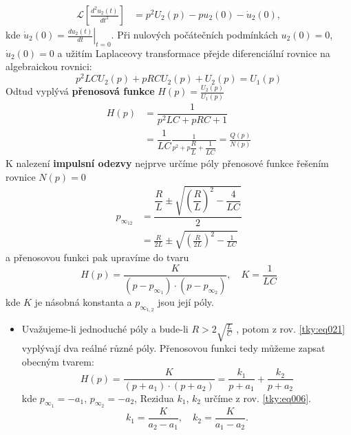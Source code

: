 \begin{mdframed}[style=mdexam]
\begin{example}
\begin{align*}
      \mathcal{L}\left[\frac{d^2u_2(t)}{dt^2}\right] &= p^2U_2(p)-pu_2(0)-\dot{u}_2(0),
    \end{align*}
    kde \(\dot{u}_2(0)=\left.\frac{du_2(t)}{dt}\right\rvert_{t=0}\). Při nulových počátečních
    podmínkách \(u_2(0) = 0\), \(\dot{u}_2(0) = 0\) a užitím Laplaceovy transformace přejde
    diferenciální rovnice na algebraickou rovnici:
    \begin{equation*}
      p^2LCU_2(p)+pRCU_2(p)+U_2(p)=U_1(p)
    \end{equation*}
    Odtud vyplývá \textbf{přenosová funkce} $H(p)=\frac{U_2(p)}{U_1(p)}$
    \begin{align}
      H(p) &=\dfrac{1}{p^2LC+pRC+1}                                   \nonumber \\
           &=\dfrac{1}{LC}\frac{1}{p^2+p\dfrac{R}{L}+\dfrac{1}{LC}}
            =\frac{Q(p)}{N(p)}                                        \label{tky:eq020}
    \end{align}
    K nalezení \textbf{impulsní odezvy} nejprve určíme póly přenosové funkce řešením rovnice
    $N(p)=0$
    \begin{align}
      p_{\infty_{12}} 
        &=\dfrac{\dfrac{R}{L}\pm\sqrt{\left(\dfrac{R}{L}\right)^2-\dfrac{4}{LC}}}{2}   \nonumber \\
        &=\frac{R}{2L}\pm\sqrt{\left(\frac{R}{2L}\right)^2-\frac{1}{LC}}          \label{tky:eq021}
    \end{align}
    a přenosovou funkci pak upravíme do tvaru
    \begin{equation*}
      H(p)=\frac{K}{(p-p_{\infty_1})\cdot(p-p_{\infty_2})}, \quad K=\frac{1}{LC}
    \end{equation*}
    kde \(K\) je násobná konstanta a \(p_{\infty_{1,2}}\) jsou její póly. 
    \begin{itemize}[leftmargin=12pt,noitemsep]
      \item Uvažujeme-li jednoduché póly a bude-li $R>2\sqrt{\frac{L}{C}}$ , potom z  rov.
            \ref{tky:eq021} vyplývají dva reálné různé póly. Přenosovou funkci tedy můžeme
            zapsat obecným tvarem:
            \begin{equation*}
              H(p)=\frac{K}{(p+a_1)\cdot(p+a_2)}=\frac{k_1}{p+a_1}+\frac{k_2}{p+a_2}
            \end{equation*}
            kde $p_{\infty_1}=-a_1,\, p_{\infty_2}=-a_2$, Rezidua  \(k_1\), \(k_2\) určíme z rov.
            \ref{tky:eq006}. 
            \begin{equation*}
              k_1=\frac{K}{a_2-a_1}, \quad k_2=\frac{K}{a_1-a_2}.

\end{equation*}
\end{itemize}
\end{example}
\end{mdframed}
